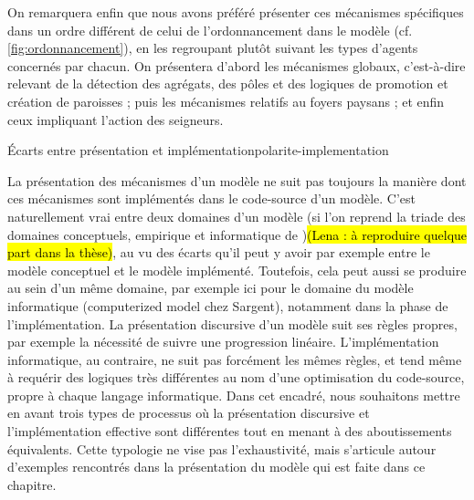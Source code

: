 
On remarquera enfin que nous avons préféré présenter ces mécanismes spécifiques dans un ordre différent de celui de l'ordonnancement dans le modèle (cf. \cref{fig:ordonnancement}), en les regroupant plutôt suivant les types d'agents concernés par chacun.
On présentera d'abord les mécanismes \og globaux\fg{}, c'est-à-dire relevant de la détection des agrégats, des pôles et des logiques de promotion et création de paroisses ; puis les mécanismes relatifs au foyers paysans ; et enfin ceux impliquant l'action des seigneurs.

\bigskip 
\begin{encadre}{Écarts entre présentation et implémentation}{polarite-implementation}
	
La présentation des mécanismes d'un modèle ne suit pas toujours la manière dont ces mécanismes sont implémentés dans le code-source d'un modèle.
C'est naturellement vrai entre deux \og domaines\fg{} d'un modèle (si l'on reprend la triade des domaines conceptuels, empirique et informatique de \textcite[\ppno~3, fig. 2]{sargent2009verification})\hl{(Lena : à reproduire quelque part dans la thèse)}, au vu des écarts qu'il peut y avoir par exemple entre le modèle conceptuel et le modèle implémenté.
Toutefois, cela peut aussi se produire au sein d'un même domaine, par exemple ici pour le domaine du modèle informatique (\og computerized model\fg{} chez Sargent), notamment dans la phase de l'implémentation.
La présentation discursive d'un modèle suit ses règles propres, par exemple la nécessité de suivre une progression linéaire.
L'implémentation informatique, au contraire, ne suit pas forcément les mêmes règles, et tend même à requérir des logiques très différentes au nom d'une \og optimisation\fg{} du code-source, propre à chaque langage informatique.
Dans cet encadré, nous souhaitons mettre en avant trois types de processus où la présentation discursive et l'implémentation effective sont différentes tout en menant à des aboutissements équivalents.
Cette typologie ne vise pas l'exhaustivité, mais s'articule autour d'exemples rencontrés dans la présentation du modèle qui est faite dans ce chapitre.


\end{encadre}
